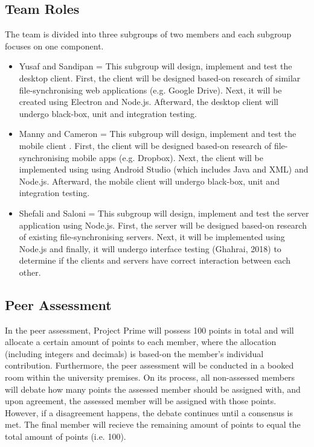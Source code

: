 \documentclass{article}
\begin{document}
	\subsection{Team Roles}
	The team is divided into three subgroups of two members and each subgroup focuses on one component.
	\begin{itemize}
	\item Yusaf and Sandipan = This subgroup will design, implement and test the desktop client. First, the client will be designed based-on research of similar file-synchronising web applications (e.g. Google Drive). Next, it will be created using Electron and Node.js. Afterward, the desktop client will undergo black-box, unit and integration testing. 
	\item Manny and Cameron = This subgroup will  design, implement and test the mobile client . First, the client will be designed based-on research of file-synchronising mobile apps (e.g. Dropbox). Next, the client will be implemented using using Android Studio (which includes Java and XML) and Node.js.  Afterward, the mobile client will undergo black-box, unit and integration testing.
	\item Shefali and Saloni = This subgroup will  design, implement and test the server application using Node.js. First, the server will be designed based-on research of existing file-synchronising servers. Next, it will be implemented using Node.js and finally, it will undergo interface testing (Ghahrai, 2018) to determine if the clients and servers have correct interaction between each other.  
	\end{itemize}

	\subsection{Peer Assessment}
	In the peer assessment, Project Prime will possess 100 points in total and will allocate a certain amount of points to each member, where the allocation (including integers and decimals) is based-on the member's individual contribution. Furthermore, the peer assessment will be conducted in a booked room within the university premises. On its process, all non-assessed members will debate how many points the assessed member should be assigned  with, and upon agreement, the assessed member will be assigned with those points. However, if a disagreement happens, the debate continues until a consensus is met. The final member will recieve the remaining amount of points to equal the total amount of points (i.e. 100). 
\end{document}
